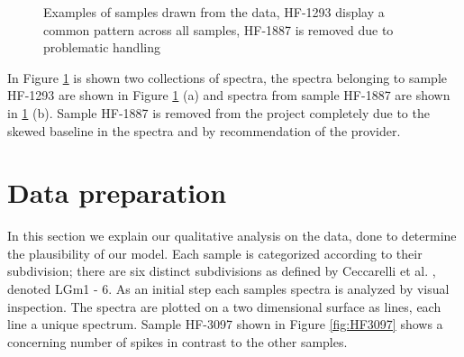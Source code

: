 \begin{figure}[h]

    \centering
    \qquad
    \caption{Examples of samples drawn from the data, HF-1293 display a common pattern across all samples, HF-1887 is removed due to problematic handling
    \label{fig:spectrum}}%
\end{figure}

In Figure \ref{fig:spectrum} is shown two collections of spectra, the spectra belonging to sample HF-1293 are shown in Figure \ref{fig:spectrum} (a) and spectra from sample HF-1887 are shown in \ref{fig:spectrum} (b).
Sample HF-1887 is removed from the project completely due to the skewed baseline in the spectra and by recommendation of the provider.

\section{Data preparation}
In this section we explain our qualitative analysis on the data, done to determine the plausibility of our model. Each sample is categorized according to their subdivision; there are six distinct subdivisions as defined by Ceccarelli et al. \cite{cellsubsets}, denoted LGm1 - 6. As an initial step each samples spectra is analyzed by visual inspection. The spectra are plotted on a two dimensional surface as lines, each line a unique spectrum. Sample HF-3097 shown in Figure \ref{fig:HF3097} shows a concerning number of spikes in contrast to the other samples.


